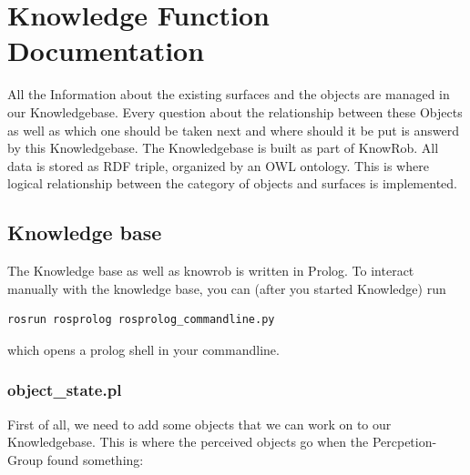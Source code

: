 \documentclass[main.tex]{subfiles}
\begin{document}
	\begingroup

	\renewcommand{\cleardoublepage}{}

	\renewcommand{\clearpage}{}

	\chapter{Knowledge Function Documentation}


All the Information about the existing surfaces and the objects are managed in our Knowledgebase. Every question about the relationship between these Objects as well as which one should be taken next and where should it be put is answerd by this Knowledgebase.  The Knowledgebase is built as part of KnowRob. All data is stored as RDF triple, organized by an OWL ontology. This is where logical relationship between the category of objects and surfaces is implemented. \\
		
\section{Knowledge base}

The Knowledge base as well as knowrob is written in Prolog. To interact manually with the knowledge base, you can (after you started Knowledge) run
\begin{lstlisting}
rosrun rosprolog rosprolog_commandline.py
\end{lstlisting}
which opens a prolog shell in your commandline.

\subsection{object\_state.pl}

First of all, we need to add some objects that we can work on to our Knowledgebase. This is where the perceived objects go when the Percpetion-Group found something:
\end{document}
